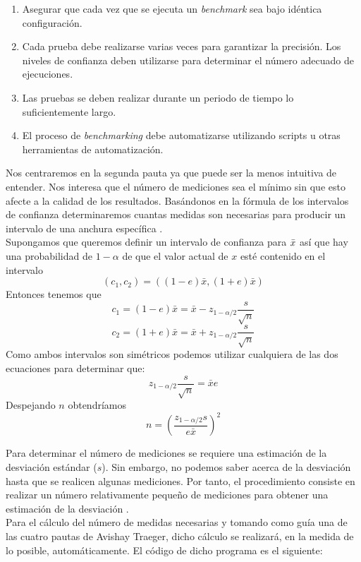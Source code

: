 \begin{enumerate}
    \item Asegurar que cada vez que se ejecuta un \textit{benchmark} sea bajo idéntica configuración.
    \item Cada prueba debe realizarse varias veces para garantizar la precisión. Los niveles de confianza deben utilizarse para determinar el número adecuado de ejecuciones.
    \item Las pruebas se deben realizar durante un periodo de tiempo lo suficientemente largo.
    \item El proceso de \textit{benchmarking} debe automatizarse utilizando scripts u otras herramientas de automatización.
\end{enumerate}

Nos centraremos en la segunda pauta ya que puede ser la menos intuitiva de entender. Nos interesa que el número de mediciones sea el mínimo sin que esto afecte a la calidad de los resultados. Basándonos en la fórmula de los intervalos de confianza determinaremos cuantas medidas son necesarias para producir un intervalo de una anchura específica \cite{lilja_2000}. \\

Supongamos que queremos definir un intervalo de confianza para $\Bar{x}$ así que hay una probabilidad de $1-\alpha$ de que el valor actual de $x$ esté contenido en el intervalo  $$
\left(c_{1}, c_{2}\right)=((1-e) \bar{x},(1+e) \bar{x})
$$ 
Entonces tenemos que 
$$
c_{1}=(1-e) \bar{x}=\bar{x}-z_{1-\alpha / 2} \frac{s}{\sqrt{n}}
$$
$$
c_{2}=(1+e) \bar{x}=\bar{x}+z_{1-\alpha / 2} \frac{s}{\sqrt{n}}
$$
Como ambos intervalos son simétricos podemos utilizar cualquiera de las dos ecuaciones para determinar que:
$$
z_{1-\alpha / 2} \frac{s}{\sqrt{n}}=\bar{x} e
$$
Despejando $n$ obtendríamos
\begin{equation}
\label{eqn:n-ejecuciones}
n=\left(\frac{z_{1-\alpha / 2} s}{e \bar{x}}\right)^{2}
\end{equation}
 

Para determinar el número de mediciones se requiere una estimación de la desviación estándar ($s$). Sin embargo, no podemos saber acerca de la desviación hasta que se realicen algunas mediciones. Por tanto, el procedimiento consiste en realizar un número relativamente pequeño de mediciones para obtener una estimación de la desviación \cite{lilja_2000}. \\ 

Para el cálculo del número de medidas necesarias y tomando como guía una de las cuatro pautas de Avishay Traeger, dicho cálculo se realizará, en la medida de lo posible, automáticamente. El código de dicho programa es el siguiente:  

